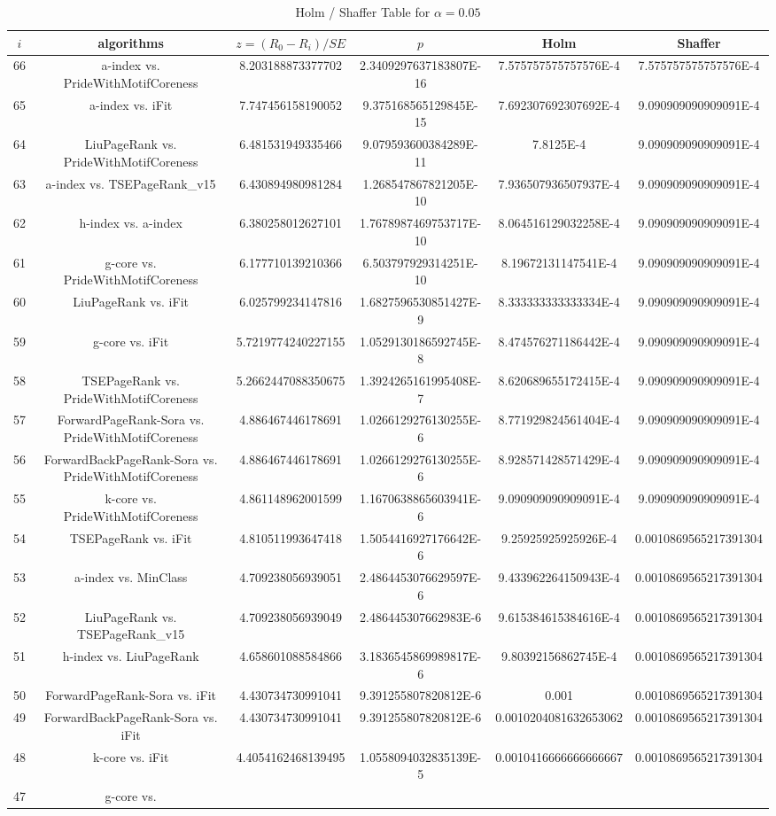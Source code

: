 \documentclass[a4paper,10pt]{article}
\begin{document}
\begin{landscape}
\begin{table}[!htp]
\centering\tiny
\caption{Holm / Shaffer Table for $\alpha=0.05$}
\begin{tabular}{cccccc}
$i$&algorithms&$z=(R_0 - R_i)/SE$&$p$&Holm&Shaffer\\
\hline
66&a-index vs. PrideWithMotifCoreness&8.203188873377702&2.3409297637183807E-16&7.575757575757576E-4&7.575757575757576E-4\\65&a-index vs. iFit&7.747456158190052&9.375168565129845E-15&7.692307692307692E-4&9.090909090909091E-4\\64&LiuPageRank vs. PrideWithMotifCoreness&6.481531949335466&9.079593600384289E-11&7.8125E-4&9.090909090909091E-4\\63&a-index vs. TSEPageRank_v15&6.430894980981284&1.268547867821205E-10&7.936507936507937E-4&9.090909090909091E-4\\62&h-index vs. a-index&6.380258012627101&1.7678987469753717E-10&8.064516129032258E-4&9.090909090909091E-4\\61&g-core vs. PrideWithMotifCoreness&6.177710139210366&6.503797929314251E-10&8.19672131147541E-4&9.090909090909091E-4\\60&LiuPageRank vs. iFit&6.025799234147816&1.6827596530851427E-9&8.333333333333334E-4&9.090909090909091E-4\\59&g-core vs. iFit&5.7219774240227155&1.0529130186592745E-8&8.474576271186442E-4&9.090909090909091E-4\\58&TSEPageRank vs. PrideWithMotifCoreness&5.2662447088350675&1.3924265161995408E-7&8.620689655172415E-4&9.090909090909091E-4\\57&ForwardPageRank-Sora vs. PrideWithMotifCoreness&4.886467446178691&1.0266129276130255E-6&8.771929824561404E-4&9.090909090909091E-4\\56&ForwardBackPageRank-Sora vs. PrideWithMotifCoreness&4.886467446178691&1.0266129276130255E-6&8.928571428571429E-4&9.090909090909091E-4\\55&k-core vs. PrideWithMotifCoreness&4.861148962001599&1.1670638865603941E-6&9.090909090909091E-4&9.090909090909091E-4\\54&TSEPageRank vs. iFit&4.810511993647418&1.5054416927176642E-6&9.25925925925926E-4&0.0010869565217391304\\53&a-index vs. MinClass&4.709238056939051&2.4864453076629597E-6&9.433962264150943E-4&0.0010869565217391304\\52&LiuPageRank vs. TSEPageRank_v15&4.709238056939049&2.486445307662983E-6&9.615384615384616E-4&0.0010869565217391304\\51&h-index vs. LiuPageRank&4.658601088584866&3.1836545869989817E-6&9.80392156862745E-4&0.0010869565217391304\\50&ForwardPageRank-Sora vs. iFit&4.430734730991041&9.391255807820812E-6&0.001&0.0010869565217391304\\49&ForwardBackPageRank-Sora vs. iFit&4.430734730991041&9.391255807820812E-6&0.0010204081632653062&0.0010869565217391304\\48&k-core vs. iFit&4.4054162468139495&1.0558094032835139E-5&0.0010416666666666667&0.0010869565217391304\\47&g-core vs. 
\end{tabular}
\end{table}
\end{landscape}
\end{document}
